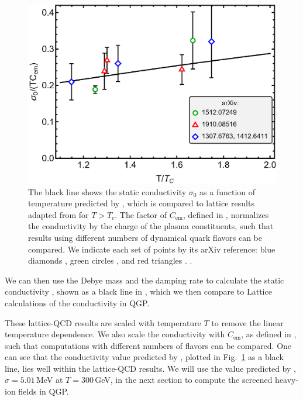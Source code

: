 \begin{figure}[ht]
    \centering
    \includegraphics[width=0.85\linewidth]{plots/chap02QCD/condcomp.png}
    \caption{The black line shows the static conductivity $\sigma_0$ as a function of temperature predicted by , which is compared to lattice results adapted from \cite{Aarts:2020dda} for $T>T_c$. The factor of $C_{\text{em}}$, defined in , normalizes the conductivity by the charge of the plasma constituents, such that results using different numbers of dynamical quark flavors can be compared. We indicate each set of points by its arXiv reference: blue diamonds \cite{Amato:2013naa,Aarts:2014nba}, green circles \cite{Brandt:2015aqk}, and red triangles \cite{Astrakhantsev:2019zkr}. .}
    \label{fig:lattice comp}
\end{figure}

We can then use the Debye mass  and the damping rate  to calculate the static conductivity , shown as a black line in , which we then compare to Lattice calculations of the conductivity in QGP.

These lattice-QCD results \cite{Amato:2013naa,Aarts:2014nba,Brandt:2015aqk,Astrakhantsev:2019zkr} are scaled with temperature $T$ to remove the linear temperature dependence. We also scale the conductivity with $C_{\text{em}}$, as defined in , such that computations with different numbers of flavors can be compared. One can see that the conductivity value predicted by , plotted in Fig.~\ref{fig:lattice comp} as a black line, lies well within the lattice-QCD results. We will use the value predicted by , $\sigma = 5.01\,$MeV at $T=300\,$GeV, in the next section to compute the screened heavy-ion fields in QGP.

